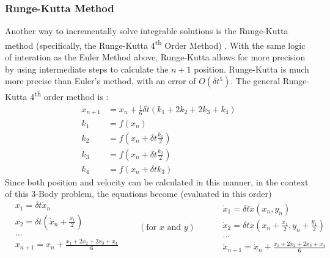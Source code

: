 \documentclass[preprint,titlepage,preprintnumbers,amsmath,amssymb,aps,11pt]{revtex4-2}
\begin{document}
\subsubsection{Runge-Kutta Method}\label{sec:rungekutta}
Another way to incrementally solve integrable solutions is the Runge-Kutta method (specifically, the Runge-Kutta 4\textsuperscript{th} Order Method) \cite{Musielak_2014}. With the same logic of interation as the Euler Method above, Runge-Kutta allows for more precision by using intermediate steps to calculate the $n+1$ position. Runge-Kutta is much more precise than Euler's method, with an error of $O(\delta t^5)$. The general Runge-Kutta 4\textsuperscript{th} order method is \cite[p. 21]{Musielak_2014}:
\begin{equation}
    \begin{aligned}
        x_{n+1} & =x_n+\frac{1}{6}\delta t(k_1+2k_2+2k_3+k_4) \\
        k_1     & =f(x_n)                                     \\
        k_2     & =f(x_n+\delta t\frac{k_1}{2})               \\
        k_3     & =f(x_n+\delta t\frac{k_2}{2})               \\
        k_4     & =f(x_n+\delta tk_3)
    \end{aligned}
    \label{eq:rungekutta}
\end{equation}
Since both position and velocity can be calculated in this manner, in the context of this 3-Body problem, the equations become (evaluated in this order)
\begin{equation}
    \begin{split}
        &x_1=\delta t\dot{x}_n \\
        &x_2=\delta t(\dot{x}_n+\frac{\dot{x}_1}{2}) \\
        &... \\
        &x_{n+1}=x_n+\frac{x_1+2x_2+2x_3+x_4}{6} \\
    \end{split}
    \qquad(\text{for }x\text{ and } y)\qquad
    \begin{split}
        &\dot{x}_1=\delta t\ddot{x}(x_n,y_n) \\
        &\dot{x}_2=\delta t\ddot{x}(x_n+\frac{x_1}{2},y_n+\frac{y_1}{2}) \\
        &... \\
        &\dot{x}_{n+1}=\dot{x}_n+\frac{\dot{x}_1+2\dot{x}_2+2\dot{x}_3+\dot{x}_4}{6}
    \end{split}
    \label{eq:rungekutta-3bp}
\end{equation}
\end{document}
